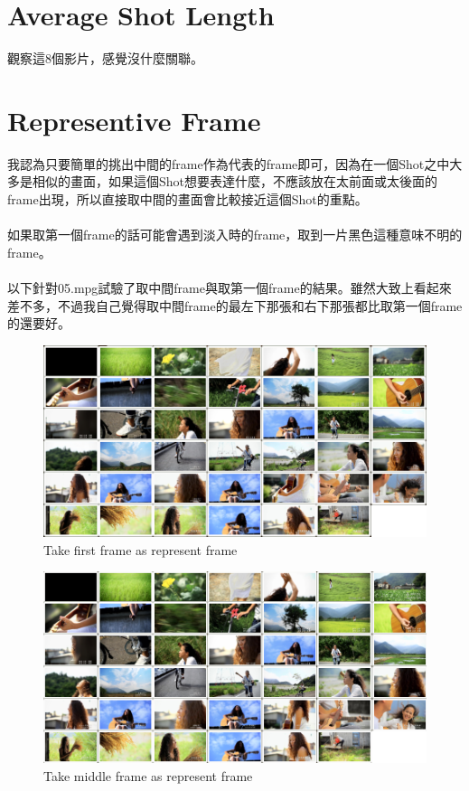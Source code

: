 \documentclass[11pt]{article}
\begin{document}
\section{Average Shot Length}
\begin{CJK}{UTF8}{bkai}
觀察這8個影片，感覺沒什麼關聯。
\end{CJK}

\section{Representive Frame}
\begin{CJK}{UTF8}{bkai}
我認為只要簡單的挑出中間的frame作為代表的frame即可，因為在一個Shot之中大多是相似的畫面，如果這個Shot想要表達什麼，不應該放在太前面或太後面的frame出現，所以直接取中間的畫面會比較接近這個Shot的重點。\\
\\
如果取第一個frame的話可能會遇到淡入時的frame，取到一片黑色這種意味不明的frame。\\
\\
以下針對05.mpg試驗了取中間frame與取第一個frame的結果。雖然大致上看起來差不多，不過我自己覺得取中間frame的最左下那張和右下那張都比取第一個frame的還要好。\\

\begin{figure}[ht]
\centering
\includegraphics[scale=0.7]{first.png}
\caption{Take first frame as represent frame}
\label{}
\end{figure}

\begin{figure}[ht]
\centering
\includegraphics[scale=0.7]{middle.png}
\caption{Take middle frame as represent frame}
\label{}
\end{figure}

\end{CJK}
\end{document}
